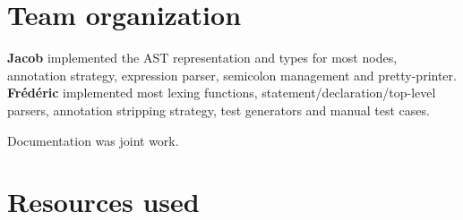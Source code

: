 \documentclass[letterpaper,11pt]{article}
\begin{document}
\section{Team organization}

\textbf{Jacob} implemented the AST representation and types for most nodes, annotation strategy, expression parser, semicolon management and pretty-printer.
\\
\textbf{Fr\'ed\'eric} implemented most lexing functions, statement/declaration/top-level parsers, annotation stripping strategy, test generators and manual test cases.

Documentation was joint work.

\section{Resources used}
\end{document}
